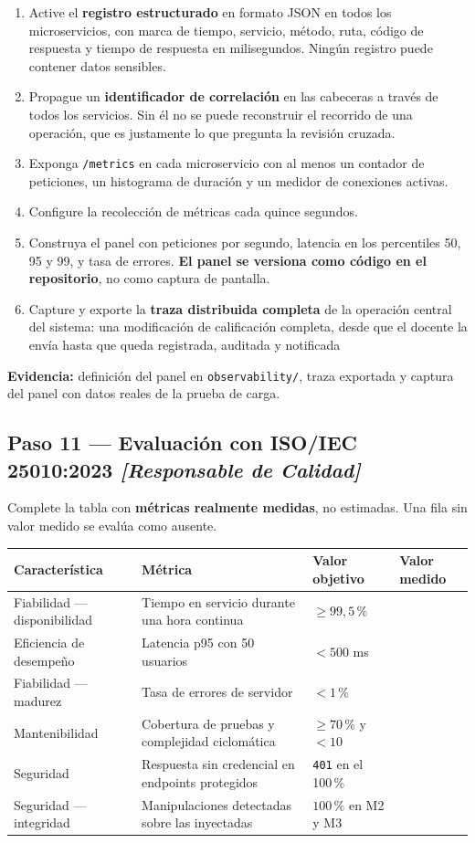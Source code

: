 \documentclass[11pt,a4paper]{article}
\newcommand{\paso}[1]{\subsection{#1}}
\begin{document}
	\begin{enumerate}[leftmargin=*,itemsep=4pt]
		\item Active el \textbf{registro estructurado} en formato JSON en todos los microservicios, con marca de tiempo, servicio, método, ruta, código de respuesta y tiempo de respuesta en milisegundos. Ningún registro puede contener datos sensibles.
		\item Propague un \textbf{identificador de correlación} en las cabeceras a través de todos los servicios. Sin él no se puede reconstruir el recorrido de una operación, que es justamente lo que pregunta la revisión cruzada.
		\item Exponga \texttt{/metrics} en cada microservicio con al menos un contador de peticiones, un histograma de duración y un medidor de conexiones activas.
		\item Configure la recolección de métricas cada quince segundos.
		\item Construya el panel con peticiones por segundo, latencia en los percentiles 50, 95 y 99, y tasa de errores. \textbf{El panel se versiona como código en el repositorio}, no como captura de pantalla.
		\item Capture y exporte la \textbf{traza distribuida completa} de la operación central del sistema: una modificación de calificación completa, desde que el docente la envía hasta que queda registrada, auditada y notificada
	\end{enumerate}
	
	\textbf{Evidencia:} definición del panel en \texttt{observability/}, traza exportada y captura del panel con datos reales de la prueba de carga.
	
	\paso{Paso 11 --- Evaluación con ISO/IEC 25010:2023 \emph{[Responsable de Calidad]}}
	
	Complete la tabla con \textbf{métricas realmente medidas}, no estimadas. Una fila sin valor medido se evalúa como ausente.
	
	\begin{center}
		\small
		\begin{tabular}{@{}p{3.5cm}p{5.6cm}p{2.6cm}p{2.6cm}@{}}
			\toprule
			\textbf{Característica} & \textbf{Métrica} & \textbf{Valor objetivo} & \textbf{Valor medido} \\
			\midrule
			Fiabilidad --- disponibilidad & Tiempo en servicio durante una hora continua & $\geq 99{,}5\,\%$ & \\
			Eficiencia de desempeño & Latencia p95 con 50 usuarios & $< 500$ ms & \\
			Fiabilidad --- madurez & Tasa de errores de servidor & $< 1\,\%$ & \\
			Mantenibilidad & Cobertura de pruebas y complejidad ciclomática & $\geq 70\,\%$ y $< 10$ & \\
			Seguridad & Respuesta sin credencial en endpoints protegidos & \texttt{401} en el 100\,\% & \\
			Seguridad --- integridad & Manipulaciones detectadas sobre las inyectadas & $100\,\%$ en M2 y M3 & \\
			\bottomrule
		\end{tabular}
	\end{center}
	
\end{document}
